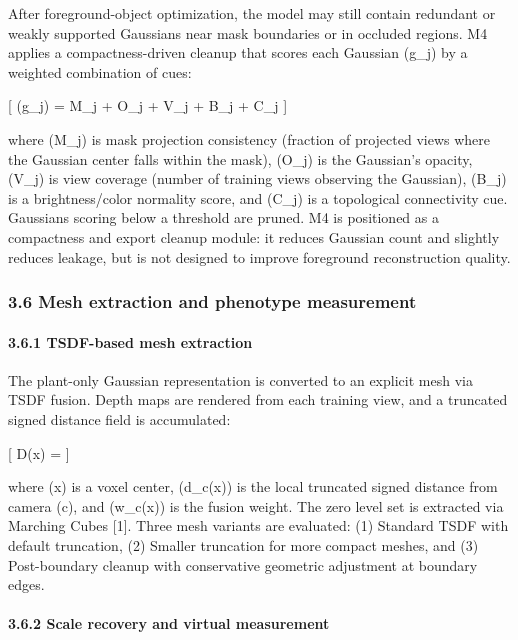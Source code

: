 \documentclass[11pt,a4paper]{article}
\begin{document}
After foreground-object optimization, the model may still contain
redundant or weakly supported Gaussians near mask boundaries or in
occluded regions. M4 applies a compactness-driven cleanup that scores
each Gaussian (g\_j) by a weighted combination of cues:

{[} (g\_j) = \alpha M\_j + \beta O\_j + \gamma V\_j
+ \delta B\_j + \eta C\_j {]}

where (M\_j) is mask projection consistency (fraction of projected views
where the Gaussian center falls within the mask), (O\_j) is the
Gaussian's opacity, (V\_j) is view coverage (number of training views
observing the Gaussian), (B\_j) is a brightness/color normality score,
and (C\_j) is a topological connectivity cue. Gaussians scoring below a
threshold are pruned. M4 is positioned as a compactness and export
cleanup module: it reduces Gaussian count and slightly reduces leakage,
but is not designed to improve foreground reconstruction quality.

\subsubsection{3.6 Mesh extraction and phenotype
measurement}\label{mesh-extraction-and-phenotype-measurement}

\paragraph{3.6.1 TSDF-based mesh
extraction}\label{tsdf-based-mesh-extraction}

The plant-only Gaussian representation is converted to an explicit mesh
via TSDF fusion. Depth maps are rendered from each training view, and a
truncated signed distance field is accumulated:

{[} D(x) =  {]}

where (x) is a voxel center, (d\_c(x)) is the local truncated signed
distance from camera (c), and (w\_c(x)) is the fusion weight. The zero
level set is extracted via Marching Cubes {[}1{]}. Three mesh variants
are evaluated: (1) Standard TSDF with default truncation, (2) Smaller
truncation for more compact meshes, and (3) Post-boundary cleanup with
conservative geometric adjustment at boundary edges.

\paragraph{3.6.2 Scale recovery and virtual
measurement}\label{scale-recovery-and-virtual-measurement}
\end{document}
